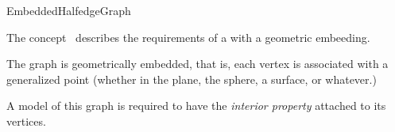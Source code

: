 
\begin{ccRefConcept}{EmbeddedHalfedgeGraph}


\ccDefinition

The concept \ccRefName\ describes the requirements of a 
with a geometric embeeding.


The graph is geometrically embedded, that is, each vertex is associated with
 a generalized point (whether in the plane, the sphere, a surface, or whatever.)
 
\ccRefines
{}

A model of this graph is required to have the {\em interior property}  attached to its vertices.

\ccTypes


\ccHasModels
{}

\end{ccRefConcept}

